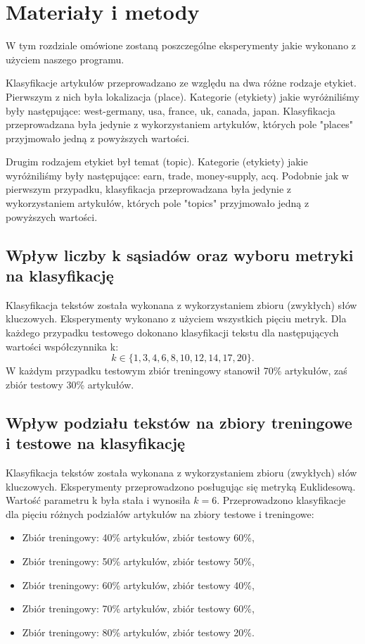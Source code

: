 \documentclass{classrep}
\begin{document}
\section{Materiały i metody}
W tym rozdziale omówione zostaną poszczególne eksperymenty jakie wykonano z użyciem naszego programu. \newline

Klasyfikacje artykułów przeprowadzano ze względu na dwa różne rodzaje etykiet. Pierwszym z nich była lokalizacja (place). Kategorie (etykiety) jakie wyróżniliśmy były następujące: west-germany, usa, france, uk, canada, japan. Klasyfikacja przeprowadzana była jedynie z wykorzystaniem artykułów, których pole "places" przyjmowało jedną z powyższych wartości. \newline

Drugim rodzajem etykiet był temat (topic). Kategorie (etykiety) jakie wyróżniliśmy były następujące: earn, trade, money-supply, acq. Podobnie jak w pierwszym przypadku, klasyfikacja przeprowadzana była jedynie z wykorzystaniem artykułów, których pole "topics" przyjmowało jedną z powyższych wartości.

\subsection{Wpływ liczby k sąsiadów oraz wyboru metryki na klasyfikację}
Klasyfikacja tekstów została wykonana z wykorzystaniem zbioru (zwykłych) słów kluczowych. Eksperymenty wykonano z użyciem wszystkich pięciu metryk. Dla każdego przypadku testowego dokonano klasyfikacji tekstu dla następujących wartości współczynnika k:
\begin{equation}
            k \in \{1, 3, 4, 6, 8, 10, 12, 14, 17, 20\}.
 \end{equation}
W każdym przypadku testowym zbiór treningowy stanowił 70\% artykułów, zaś zbiór testowy 30\% artykułów.

\subsection{Wpływ podziału tekstów na zbiory treningowe i testowe na klasyfikację}
Klasyfikacja tekstów została wykonana z wykorzystaniem zbioru (zwykłych) słów kluczowych. Eksperymenty przeprowadzono posługując się metryką Euklidesową. Wartość parametru k była stała i wynosiła $k=6$. Przeprowadzono klasyfikacje dla pięciu różnych podziałów artykułów na zbiory testowe i treningowe: 
\begin{itemize}[label=$\bullet$\scshape\bfseries]

\item Zbiór treningowy: 40\% artykułów, zbiór testowy 60\%,
\item Zbiór treningowy: 50\% artykułów, zbiór testowy 50\%,
\item Zbiór treningowy: 60\% artykułów, zbiór testowy 40\%,
\item Zbiór treningowy: 70\% artykułów, zbiór testowy 60\%,
\item Zbiór treningowy: 80\% artykułów, zbiór testowy 20\%.

\end{itemize}
\end{document}
